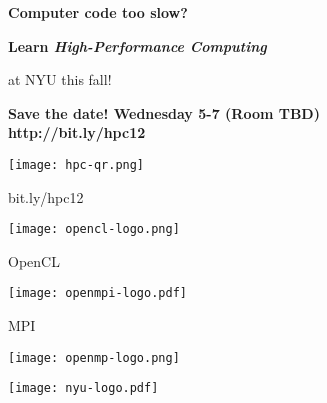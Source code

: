 \documentclass[10pt]{article}
\begin{document}
%
%
\vspace{-5ex}

\begin{center}
  {\bfseries\Large
    Computer code too slow?\\[2mm]
  }
  {\bfseries\huge
    Learn \emph{High-Performance Computing}

    at NYU this fall!
  }

\end{center}

\begin{multicols}{2}

\end{multicols}

\begin{center}
  {\bfseries\LARGE
    Save the date! Wednesday 5-7 (Room TBD)\\[1em]

    \Huge http://bit.ly/hpc12
  }
\end{center}

\begin{center}
  \begin{minipage}{0.2\textwidth}
    \centering
    \texttt{[image: hpc-qr.png]}

    \LARGE\textsf{bit.ly/hpc12}
  \end{minipage}%
  \begin{minipage}{0.2\textwidth}
    \centering
    \texttt{[image: opencl-logo.png]}

    \Large{}\selectfont OpenCL
  \end{minipage}%
  \begin{minipage}{0.2\textwidth}
    \centering
    \texttt{[image: openmpi-logo.pdf]}

    \Large{}\selectfont MPI
  \end{minipage}%
  \begin{minipage}{0.2\textwidth}
    \texttt{[image: openmp-logo.png]}
  \end{minipage}%
  \begin{minipage}{0.2\textwidth}
    \centering
    \texttt{[image: nyu-logo.pdf]}
  \end{minipage}
\end{center}

\end{document}
